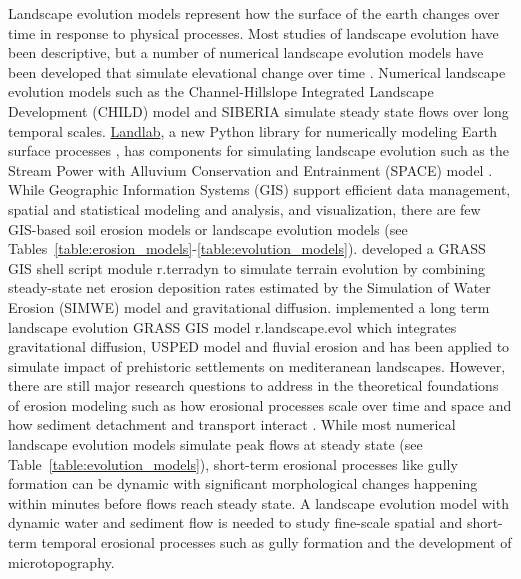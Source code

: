 \documentclass[gmd, manuscript]{copernicus}
\begin{document}
\introduction
Landscape evolution models represent how the surface of the earth changes 
over time in response to physical processes. 
Most studies of landscape evolution have been descriptive, 
but a number of numerical landscape evolution models 
have been developed that simulate elevational change over time 
\citep{Temme2013}. 
Numerical landscape evolution models
such as the Channel-Hillslope Integrated Landscape Development (CHILD) model 
\citep{Tucker2001} 
and SIBERIA \citep{Willgoose2005}
simulate steady state flows over long temporal scales. %
\href{http://landlab.github.io/}{Landlab},
a new Python library for numerically modeling Earth surface processes
\citep{Hobley2017},
has components for simulating landscape evolution such as the 
Stream Power with Alluvium Conservation and Entrainment (SPACE) 
model \citep{Shobe2017}.
While Geographic Information Systems (GIS)
support efficient data management, 
spatial and statistical modeling and analysis, 
and visualization,
there are few GIS-based soil erosion models or landscape evolution models
(see Tables~\ref{table:erosion_models}-\ref{table:evolution_models}).
\cite{Thaxton2004} developed a GRASS GIS shell script module r.terradyn  
to simulate terrain evolution by combining steady-state net erosion deposition rates
estimated by the Simulation of Water Erosion (SIMWE) model \citep{Mitas1998}
and gravitational diffusion. \cite{Barton2010} implemented a long term
landscape evolution GRASS GIS model r.landscape.evol which integrates gravitational diffusion,
USPED model and fluvial erosion and has been applied to simulate impact of prehistoric settlements
on mediteranean landscapes.
However, there are still major research questions 
to address in the theoretical foundations of erosion modeling 
such as how erosional processes scale over time and space 
and how sediment detachment and transport interact \citep{Mitasova2013}. 
While most numerical landscape evolution models 
simulate peak flows at steady state
(see Table~\ref{table:evolution_models}),
short-term erosional processes like gully formation can be dynamic
with significant morphological changes happening within minutes
before flows reach steady state. 
A landscape evolution model with dynamic water and sediment flow
is needed to study fine-scale spatial and short-term temporal erosional processes
such as gully formation and the development of microtopography. 
\end{document}
